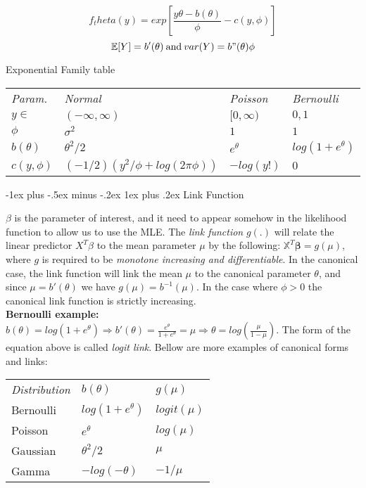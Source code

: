 \documentclass[landscape]{article}
\makeatletter
\renewcommand{\subsubsection}{\@startsection{subsubsection}{3}{0mm}%
                                {-1ex plus -.5ex minus -.2ex}%
                                {1ex plus .2ex}%
                                {\normalfont\small\bfseries}}
\makeatother
\begin{document}
\begin{multicols}{3}
$$f_theta(y) = exp\left[\frac{y \theta - b(\theta)}{\phi} - c(y, \phi) \right]$$
$$\mathbb{E}[Y] = b'(\theta) \: \text{and} \: var(Y) = b"(\theta) \phi$$

Exponential Family table

\begin{tabular}{l l l l}
    \textit{Param.} &\textit{Normal} & \textit{Poisson} & \textit{Bernoulli}\\
    $y \in$ & $(-\infty, \infty)$ & $[0, \infty)$ & ${0, 1}$\\
    $\phi$ & $\sigma^2$ & $1$ & $1$\\
    $b(\theta)$ & $\theta^2 / 2$ & $e^\theta$ & $log(1 + e^\theta)$\\
    $c(y, \phi)$ & $(-1/2) (y^2/\phi + log(2 \pi \phi))$ & $-log(y!)$ & $0$
\end{tabular}

\subsubsection{Link Function}

$\beta$ is the parameter of interest, and it need to appear somehow in the likelihood function to allow us to use the MLE. The \emph{link function} $g(.)$
will relate the linear predictor $X^T \beta$ to the mean parameter $\mu$ by the following: $\mathbb{X}^T \mathbf{\beta} = g(\mu)$, where $g$ is required
to be \emph{monotone increasing and differentiable}. In the canonical case, the link function will link the mean $\mu$ to the canonical parameter
$\theta$, and since $\mu = b'(\theta)$ we have $g(\mu) = b^{-1}(\mu)$. In the case where $\phi > 0$ the canonical link function is strictly increasing.\\

\textbf{Bernoulli example:} $b(\theta) = log(1+e^\theta) \Rightarrow b'(\theta) = \frac{e^\theta}{1 + e^\theta} = \mu \Rightarrow \theta = log \left(\frac{\mu}{1-\mu}\right)$.
The form of the equation above is called \emph{logit link}. Bellow are more examples of canonical forms and links:

\begin{tabular}{l l l}
    \textit{Distribution} & $b(\theta)$ & $g(\mu)$ \\
    Bernoulli & $log(1+e^\theta)$ & $logit(\mu)$\\
    Poisson & $e^\theta$ & $log(\mu)$ \\
    Gaussian & $\theta^2 / 2$ & $\mu$ \\
    Gamma & $-log(-\theta)$ & $-1 / \mu$
\end{tabular}


\end{multicols}
\end{document}
